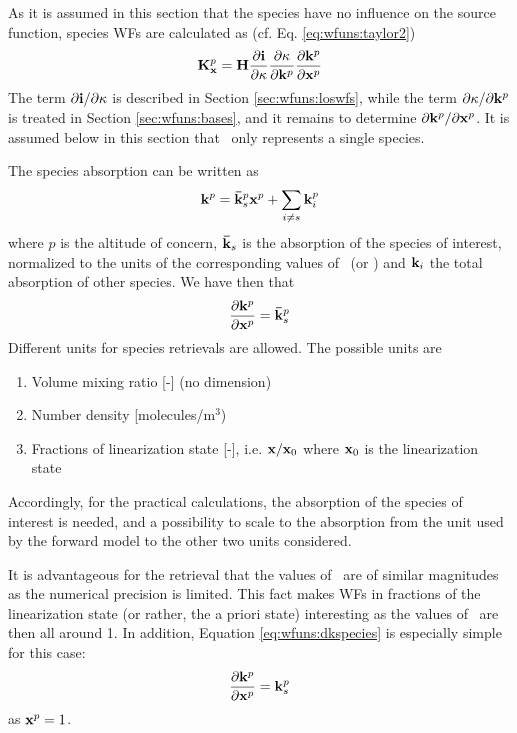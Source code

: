  \label{sec:wfuns:species}
 
 As it is assumed in this section that the species have no influence on
 the source function, species WFs are calculated as (cf. Eq.
 \ref{eq:wfuns:taylor2})
 \begin{equation}
    \mathbf{K}_{\mathbf{x}}^p = \mathbf{H}
                 \frac{\partial\mathbf{i}}{\partial \kappa}
                 \frac{\partial \kappa}{\partial \mathbf{k}^p}
                 \frac{\partial \mathbf{k}^p}{\partial \mathbf{x}^p}
  \label{eq:wfuns:species}
 \end{equation}
 The term $\partial\mathbf{i} / \partial \kappa$ is described in Section
 \ref{sec:wfuns:loswfs}, while the term $\partial \kappa /\partial
 \mathbf{k}^p$ is treated in Section \ref{sec:wfuns:bases}, and it
 remains to determine $\partial \mathbf{k}^p / \partial \mathbf{x}^p$. It is
 assumed below in this section that \xt\ only represents a single 
 species.

 The species absorption can be written as
 \begin{equation}
   \mathbf{k}^p = \mathbf{\bar{k}}^p_s \mathbf{x}^p + \sum_{i\ne s} \mathbf{k}^p_i
  \label{eq:wfuns:kspecies}
 \end{equation}
 where $p$ is the altitude of concern, $\mathbf{\bar{k}}_s$ is the
 absorption of the species of interest, normalized to the units of the
 corresponding values of \xt\ (or \bt) and $\mathbf{k}_i$ the total
 absorption of other species.
 We have then that
 \begin{equation}
   \frac{\partial \mathbf{k}^p}{\partial \mathbf{x}^p} = \mathbf{\bar{k}}^p_s
  \label{eq:wfuns:dkspecies}
 \end{equation}
 Different units for species retrievals are allowed. The possible units are
 \begin{enumerate}
    \item Volume mixing ratio [-] (no dimension)
    \item Number density [molecules/m$^3$)
    \item Fractions of linearization state [-], i.e. $\mathbf{x}/\mathbf{x}_0$ where
          $\mathbf{x}_0$ is the linearization state 
 \end{enumerate}
 Accordingly, for the practical calculations, the absorption of the
 species of interest is needed, and a possibility to scale to the
 absorption from the unit used by the forward model to the other two
 units considered.
 
 It is advantageous for the retrieval that the values of \xt\ are of
 similar magnitudes \citep{schimpf:97,eriksson:99} as the numerical
 precision is limited. This fact makes WFs
 in fractions of the linearization state (or rather, the a priori
 state) interesting as the values of \xt\ are then all around 1. In 
 addition, Equation \ref{eq:wfuns:dkspecies} is especially simple
 for this case:
 \begin{equation}
   \frac{\partial \mathbf{k}^p}{\partial \mathbf{x}^p} = \mathbf{k}^p_s
 \end{equation}
 as $\mathbf{x}^p=1$.


